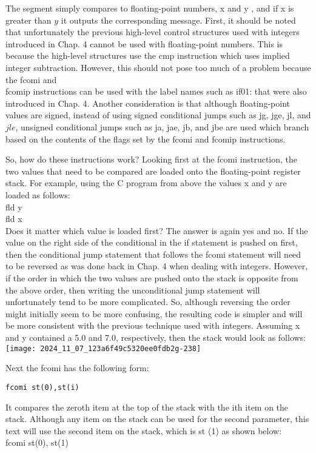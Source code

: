 \documentclass[10pt]{article}
\begin{document}
The segment simply compares to floating-point numbers, x and y , and if x is greater than $y$ it outputs the corresponding message. First, it should be noted that unfortunately the previous high-level control structures used with integers introduced in Chap. 4 cannot be used with floating-point numbers. This is because the high-level structures use the cmp instruction which uses implied integer subtraction. However, this should not pose too much of a problem because the fcomi and\\
fcomip instructions can be used with the label names such as if01: that were also introduced in Chap. 4. Another consideration is that although floating-point values are signed, instead of using signed conditional jumps such as jg, jge, jl, and $j l e$, unsigned conditional jumps such as ja, jae, jb, and jbe are used which branch based on the contents of the flags set by the fcomi and fcomip instructions.

So, how do these instructions work? Looking first at the fcomi instruction, the two values that need to be compared are loaded onto the floating-point register stack. For example, using the C program from above the values x and y are loaded as follows:\\
fld y\\
fld x\\
Does it matter which value is loaded first? The answer is again yes and no. If the value on the right side of the conditional in the if statement is pushed on first, then the conditional jump statement that follows the fcomi statement will need to be reversed as was done back in Chap. 4 when dealing with integers. However, if the order in which the two values are pushed onto the stack is opposite from the above order, then writing the unconditional jump statement will unfortunately tend to be more complicated. So, although reversing the order might initially seem to be more confusing, the resulting code is simpler and will be more consistent with the previous technique used with integers. Assuming x and y contained a 5.0 and 7.0, respectively, then the stack would look as follows:\\
\texttt{[image: 2024\_11\_07\_123a6f49c5320ee0fdb2g-238]}

Next the fcomi has the following form:

\begin{verbatim}
fcomi st(0),st(i)
\end{verbatim}

It compares the zeroth item at the top of the stack with the ith item on the stack. Although any item on the stack can be used for the second parameter, this text will use the second item on the stack, which is st (1) as shown below:\\
fcomi st(0), st(1)
\end{document}
